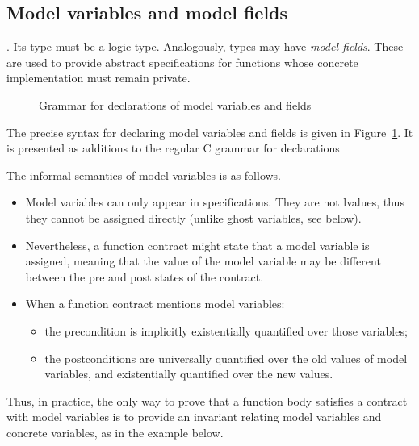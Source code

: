 \subsection{Model variables and model fields}
\label{sec:model}
 . Its type must be a logic type. Analogously,
types may have \emph{model fields}.  These are
used to provide abstract specifications for functions whose concrete
implementation must remain private.

\begin{figure}[b]
  \begin{cadre}
      
    \end{cadre}
  \caption{Grammar for declarations of model variables and fields}
\label{fig:gram:model}
\end{figure}


The precise syntax for declaring model variables and fields is given
in Figure~\ref{fig:gram:model}. It is presented as additions to the
regular C grammar for declarations

The informal semantics of model variables is as follows.
\begin{itemize}
\item Model variables can only appear in specifications. They are not
  lvalues, thus they cannot be assigned directly (unlike ghost variables,
  see below).
\item Nevertheless, a function contract might state that a model variable
  is assigned, meaning that the value of the model variable may be different between the pre and post states of the contract.
\item When a function contract mentions model variables:
  \begin{itemize}
  \item the precondition is implicitly existentially quantified over
    those variables;
  \item the postconditions are universally quantified over the old
    values of model variables, and existentially quantified over the new values.
  \end{itemize}
\end{itemize}
Thus, in practice, the only way to prove that a function body
satisfies a contract with model variables is to provide an invariant
relating model variables and concrete variables, as in the example
below.


